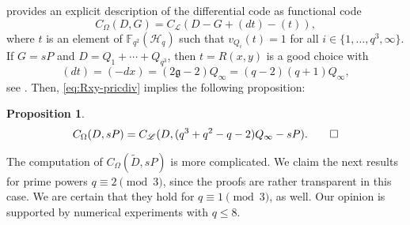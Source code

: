 \documentclass[11pt]{amsart}
\theoremstyle{plain}
\newtheorem{proposition}[theorem]{Proposition}
\theoremstyle{definition}
\theoremstyle{remark}
\newcommand{\g}{\mathfrak{g}}
\begin{document}
\cite[Proposition 8.1.2]{stichtenoth2009algebraic} provides an explicit description of the differential code as functional code
\[C_\Omega(D,G) = C_\mathscr{L}(D-G+(dt)-(t)),\]
where $t$ is an element of $\mathbb{F}_{q^2}(\mathscr{H}_q)$ such that $v_{Q_i}(t)=1$ for all $i\in \{1,\ldots,q^3,\infty\}$. If $G=sP$ and $D=Q_1+\cdots+Q_{q^3}$, then $t=R(x,y)$ is a good choice with 
\[(dt)=(-dx)=(2\g-2)Q_{\infty}=(q-2)(q+1)Q_{\infty}, \]
see \cite[Lemma 6.4.4]{stichtenoth2009algebraic}. Then, \eqref{eq:Rxy-pricdiv} implies the following proposition:
\begin{proposition}
\[C_\Omega(D,sP) = C_\mathscr{L}(D,(q^3+q^2-q-2)Q_{\infty}-sP). \qed\]
\end{proposition}

The computation of $C_\Omega(\widetilde{D},sP)$ is more complicated. We claim the next results for prime powers $q\equiv 2 \pmod3$, since the proofs are rather transparent in this case. We are certain that they hold for $q\equiv 1\pmod3$, as well. Our opinion is supported by numerical experiments with $q\leq 8$. 
\end{document}
